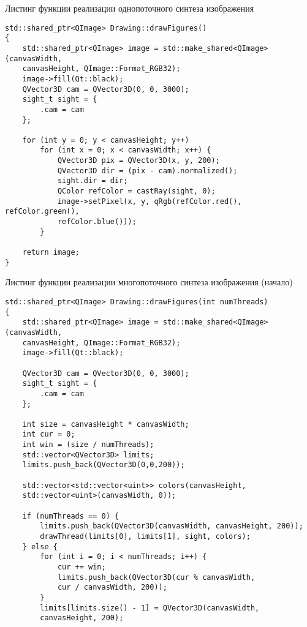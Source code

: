 \begin{code}
\caption{Листинг функции реализации однопоточного синтеза изображения}
\label{code:ray_one}
\begin{verbatim}
std::shared_ptr<QImage> Drawing::drawFigures()
{
    std::shared_ptr<QImage> image = std::make_shared<QImage>(canvasWidth, 
    canvasHeight, QImage::Format_RGB32);
    image->fill(Qt::black);
    QVector3D cam = QVector3D(0, 0, 3000);
    sight_t sight = {
        .cam = cam 
    };
    
    for (int y = 0; y < canvasHeight; y++)
        for (int x = 0; x < canvasWidth; x++) {
            QVector3D pix = QVector3D(x, y, 200);
            QVector3D dir = (pix - cam).normalized();
            sight.dir = dir;
            QColor refColor = castRay(sight, 0);
            image->setPixel(x, y, qRgb(refColor.red(), refColor.green(),
            refColor.blue()));
        }

    return image;
}
\end{verbatim}
\end{code}

\newpage

\begin{code}
\caption{Листинг функции реализации многопоточного синтеза изображения (начало)}
\label{code:ray_many1}
\begin{verbatim}
std::shared_ptr<QImage> Drawing::drawFigures(int numThreads)
{
    std::shared_ptr<QImage> image = std::make_shared<QImage>(canvasWidth,
    canvasHeight, QImage::Format_RGB32);
    image->fill(Qt::black);

    QVector3D cam = QVector3D(0, 0, 3000);
    sight_t sight = {
        .cam = cam
    };

    int size = canvasHeight * canvasWidth;
    int cur = 0;
    int win = (size / numThreads);
    std::vector<QVector3D> limits;
    limits.push_back(QVector3D(0,0,200));

    std::vector<std::vector<uint>> colors(canvasHeight,
    std::vector<uint>(canvasWidth, 0));

    if (numThreads == 0) {
        limits.push_back(QVector3D(canvasWidth, canvasHeight, 200));
        drawThread(limits[0], limits[1], sight, colors);
    } else {
        for (int i = 0; i < numThreads; i++) {
            cur += win;
            limits.push_back(QVector3D(cur % canvasWidth,
            cur / canvasWidth, 200));
        }
        limits[limits.size() - 1] = QVector3D(canvasWidth,
        canvasHeight, 200);
\end{verbatim}
\end{code}

